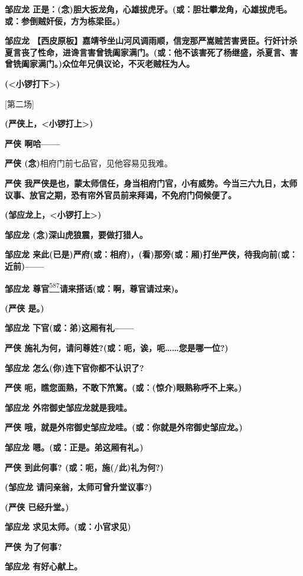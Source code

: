 \textbf{邹应龙
正是：(念)胆大扳龙角，心雄拔虎牙。(或：胆壮攀龙角，心雄拔虎毛。或：参倒贼奸佞，方为栋梁臣。)}

\textbf{邹应龙
【西皮原板】嘉靖爷坐山河风调雨顺，信宠那严嵩贼苦害贤臣。行奸计杀夏言丧了性命，进谗言害曾铣阖家满门。(或：他不该害死了杨继盛，杀夏言、害曾铣阖家满门。)众位年兄俱议论，不灭老贼枉为人。}

\textbf{(\textless{}小锣打下\textgreater{})}

{[}第二场{]}

\textbf{(严侠上，\textless{}小锣打上\textgreater{})}

\textbf{严侠 啊哈------}

\textbf{严侠 (念)}相府门前七品官，见他容易见我难。

\textbf{严侠
我严侠是也，蒙太师信任，身当相府门官，小有威势。今当三六九日，太师议事、放官之期，恐有帘外官员前来拜谒，不免府门伺候便了。}

\textbf{(邹应龙上，\textless{}小锣打上\textgreater{})}

\textbf{邹应龙 (念)深山虎狼震，要做打猎人。}

\textbf{邹应龙
来此(已是)严府(或：相府)，(看)那旁(或：厢)打坐严侠，待我向前(或：近前)------}

\textbf{邹应龙
尊官}\protect\hyperlink{fn587}{\textsuperscript{587}}\textbf{请来搭话(或：啊，尊官请过来)。}

\textbf{(严侠 是。)}

\textbf{邹应龙 下官(或：弟)这厢有礼------}

\textbf{严侠
施礼为何，请问尊姓?(或：呃，诶，呃\ldots{}\ldots{}您是哪一位?)}

\textbf{邹应龙 怎么(你)连下官你都不认识了?}

\textbf{严侠 呃，瞧您面熟，不敢下笊篱。(或：(惊介)眼熟称呼不上来。)}

\textbf{邹应龙 外帘御史邹应龙就是我哇。}

\textbf{严侠 哦，就是外帘御史邹应龙哇。(或：你就是外帘御史邹应龙。)}

\textbf{邹应龙 嗯。(或：正是。弟这厢有礼。)}

\textbf{严侠 到此何事? (或：呃，施(/此)礼为何?)}

\textbf{(邹应龙 请问亲翁，太师可曾升堂议事?)}

\textbf{(严侠 已经升堂。)}

\textbf{邹应龙 求见太师。(或：小官求见)}

\textbf{严侠 为了何事?}

\textbf{邹应龙 有好心献上。}

